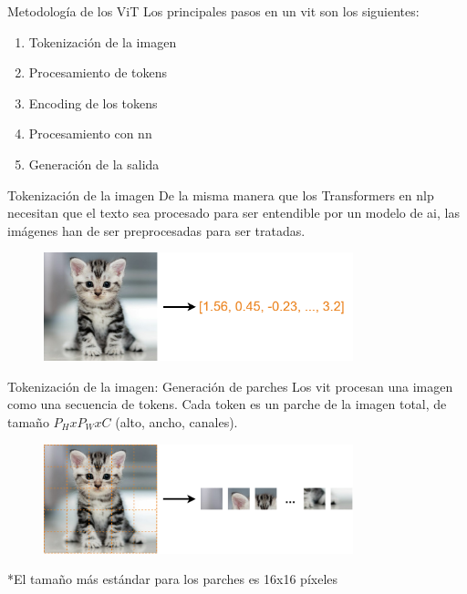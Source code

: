 \begin{frame}{Metodología de los ViT}
Los principales pasos en un \gls{vit} son los siguientes:
\begin{enumerate}
    \item Tokenización de la imagen
    \item Procesamiento de tokens
    \item Encoding de los tokens
    \item Procesamiento con \gls{nn}
    \item Generación de la salida
\end{enumerate}
\end{frame}

\begin{frame}{Tokenización de la imagen}
De la misma manera que los Transformers en \alert{\gls{nlp}} necesitan que el texto sea procesado para ser entendible por un modelo de \gls{ai}, las imágenes han de ser \alert{preprocesadas} para ser tratadas.

\begin{figure}
    \centering
    \includegraphics[width=0.8\textwidth]{Slides/figures/Vision_Transformers/Image_Preprocessing.png}
\end{figure}
\end{frame}

\begin{frame}{Tokenización de la imagen: Generación de parches}
Los \gls{vit} procesan una imagen como una \alert{secuencia de tokens}. Cada token es un \alert{parche} de la imagen total, de tamaño $P_HxP_WxC$ (alto, ancho, canales).

\begin{figure}
    \centering
    \includegraphics[width=0.8\textwidth]{Slides/figures/Vision_Transformers/Image_Tiling.png}
\end{figure}

*El tamaño más estándar para los parches es 16x16 píxeles
\end{frame}

